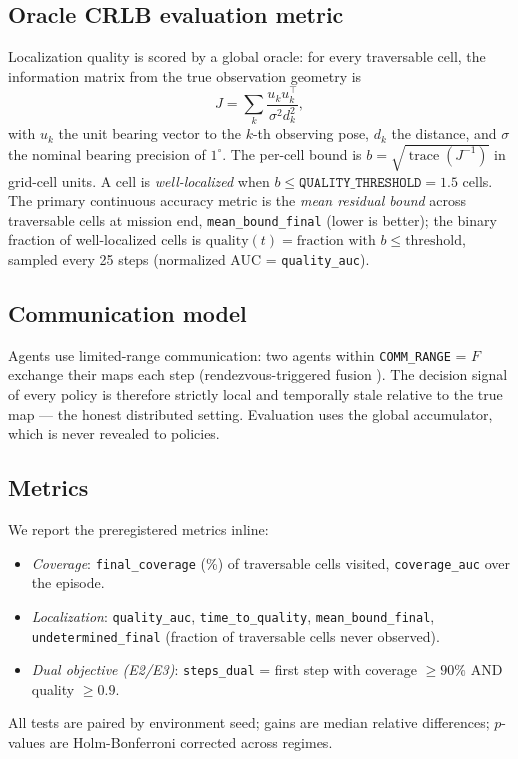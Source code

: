 \documentclass[journal]{IEEEtran}
\begin{document}
\subsection{Oracle CRLB evaluation metric}
Localization quality is scored by a global oracle: for every traversable cell,
the information matrix from the true observation geometry is
\begin{equation}
J = \sum_k \frac{u_k u_k^{\top}}{\sigma^2 d_k^2},
\end{equation}
with $u_k$ the unit bearing vector to the $k$-th observing pose, $d_k$ the
distance, and $\sigma$ the nominal bearing precision of $1^\circ$. The per-cell
bound is $b = \sqrt{\operatorname{trace}(J^{-1})}$ in grid-cell units. A cell
is \emph{well-localized} when $b \le \texttt{QUALITY\_THRESHOLD} = 1.5$ cells.
The primary continuous accuracy metric is the \emph{mean residual bound} across
traversable cells at mission end, \texttt{mean\_bound\_final} (lower is
better); the binary fraction of well-localized cells is
$\mathrm{quality}(t) = \text{fraction with } b \le \text{threshold}$, sampled
every 25 steps (normalized AUC = \texttt{quality\_auc}).

\subsection{Communication model}
Agents use limited-range communication: two agents within
\texttt{COMM\_RANGE} = $F$ exchange their maps each step (rendezvous-triggered
fusion \cite{Pongsirijinda2025, Batinovic2020}). The decision signal of every
policy is therefore strictly local and temporally stale relative to the true
map --- the honest distributed setting. Evaluation uses the global
accumulator, which is never revealed to policies.

\subsection{Metrics}
We report the preregistered metrics inline:
\begin{itemize}
\item \emph{Coverage}: \texttt{final\_coverage} (\%) of traversable cells
visited, \texttt{coverage\_auc} over the episode.
\item \emph{Localization}: \texttt{quality\_auc}, \texttt{time\_to\_quality},
\texttt{mean\_bound\_final}, \texttt{undetermined\_final} (fraction of
traversable cells never observed).
\item \emph{Dual objective (E2/E3)}: \texttt{steps\_dual} = first step with
coverage $\geq 90\%$ AND quality $\geq 0.9$.
\end{itemize}
All tests are paired by environment seed; gains are median relative
differences; $p$-values are Holm-Bonferroni corrected across regimes.
\end{document}
